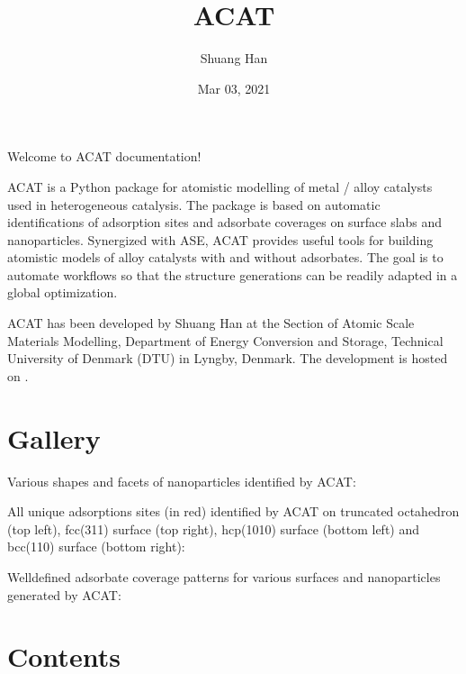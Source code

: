 \documentclass[letterpaper,10pt,english]{sphinxmanual}
\title{ACAT}
\date{Mar 03, 2021}
\author{Shuang Han}
\begin{document}
\pagestyle{empty}
\sphinxmaketitle
\pagestyle{plain}
\sphinxtableofcontents
\pagestyle{normal}
\label{\detokenize{index::doc}}


Welcome to ACAT documentation!

ACAT is a Python package for atomistic modelling of metal / alloy catalysts used in heterogeneous catalysis. The package is based on automatic identifications of adsorption sites and adsorbate coverages on surface slabs and nanoparticles. Synergized with ASE, ACAT provides useful tools for building atomistic models of alloy catalysts with and without adsorbates. The goal is to automate workflows so that the structure generations can be readily adapted in a global optimization.

ACAT has been developed by Shuang Han at the Section of Atomic Scale Materials Modelling, Department of Energy Conversion and Storage, Technical University of Denmark (DTU) in Lyngby, Denmark. The development is hosted on .


\chapter{Gallery}
\label{\detokenize{index:gallery}}
Various shapes and facets of nanoparticles identified by ACAT:


All unique adsorptions sites (in red) identified by ACAT on truncated octahedron (top left), fcc(311) surface (top right), hcp(10\sphinxhyphen{}10) surface (bottom left) and bcc(110) surface (bottom right):


Well\sphinxhyphen{}defined adsorbate coverage patterns for various surfaces and nanoparticles generated by ACAT:



\chapter{Contents}
\label{\detokenize{index:contents}}\label{\detokenize{installation:installation}}
\ignorespaces 
\end{document}
